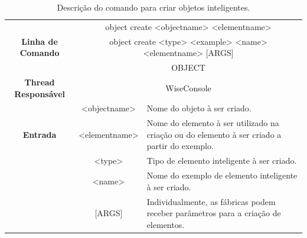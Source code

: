 \documentclass[10pt,aspectratio=169]{beamer}
\theoremstyle{remark}
\theoremstyle{definition}
\begin{document}
\begin{frame}[allowframebreaks]
	\begin{center}
		\begin{table}[!htbp]
			\begin{tabular}{|c|c|m{}|}
				\hline
				\multirow{3}{*}{\textbf{Linha de Comando}} & \multicolumn{2}{c|}{object create <object\underline{\space\space}name> <element\underline{\space\space}name>} \\
				& \multicolumn{2}{c|}{object create <type> <example> <name> <element\underline{\space\space}name> [ARGS]} \\
				\hline
				\textbf{Escopo} & \multicolumn{2}{c|}{OBJECT} \\
				\hline
				\textbf{Thread Responsável} & \multicolumn{2}{c|}{WiseConsole} \\
				\hline
				\multirow{3}{*}{\textbf{Entrada}} & <object\underline{\space\space}name> & Nome do objeto à ser criado. \\
				& <element\underline{\space\space}name> & Nome do elemento à ser utilizado na criação ou do elemento à ser criado a partir do exemplo. \\
				& <type> & Tipo de elemento inteligente à ser criado. \\
				& <name> & Nome do exemplo de elemento inteligente à ser criado. \\
				& [ARGS] & Individualmente,  as fábricas podem receber parâmetros para a criação de elementos. \\
				\hline
			\end{tabular}
			\caption{Descrição do comando para criar objetos inteligentes.}
			\label{tab:create_object}
		\end{table}
	\end{center}

\end{frame}
\end{document}
